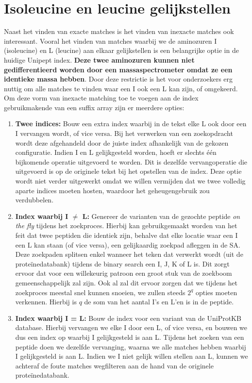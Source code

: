 \section{Isoleucine en leucine gelijkstellen}\label{sec:isoleucine-en-leucine-equivalentie}
Naast het vinden van exacte matches is het vinden van inexacte matches ook interessant.
Vooral het vinden van matches waarbij we de aminozuren I (isoleucine) en L (leucine) aan elkaar gelijkstellen is een belangrijke optie in de huidige Unipept index.
\textbf{Deze twee aminozuren kunnen niet gedifferentieerd worden door een massaspectrometer omdat ze een identieke massa hebben}.
Door deze restrictie is het voor onderzoekers erg nuttig om alle matches te vinden waar een I ook een L kan zijn, of omgekeerd.
Om deze vorm van inexacte matching toe te voegen aan de index gebruikmakende van een suffix array zijn er meerdere opties:
\begin{enumerate}
    \item \textbf{Twee indices:} Bouw een extra index waarbij in de tekst elke L ook door een I vervangen wordt, of vice versa.
    Bij het verwerken van een zoekopdracht wordt deze afgehandeld door de juiste index afhankelijk van de gekozen configuratie.
    Indien I en L gelijkgesteld worden, hoeft er slechts één bijkomende operatie uitgevoerd te worden.
    Dit is dezelfde vervangoperatie die uitgevoerd is op de originele tekst bij het opstellen van de index.
    Deze optie wordt niet verder uitgewerkt omdat we willen vermijden dat we twee volledig aparte indices moeten hosten, waardoor het geheugengebruik zou verdubbelen.
    \item \textbf{Index waarbij I $\neq$ L:} Genereer de varianten van de gezochte peptide \textit{on the fly} tijdens het zoekproces.
    Hierbij kan gebruikgemaakt worden van het feit dat twee peptiden die identiek zijn, behalve dat elke locatie waar een I een L kan staan (of vice versa), een gelijkaardig zoekpad afleggen in de SA\@.
    Deze zoekpaden splitsen enkel wanneer het teken dat verwerkt wordt (uit de proteïnedatabank) tijdens de binary search een I, J, K of L is.
    Dit zorgt ervoor dat voor een willekeurig patroon een groot stuk van de zoekboom gemeenschappelijk zal zijn.
    Ook al zal dit ervoor zorgen dat we tijdens het zoekproces meestal snel kunnen snoeien, we zullen steeds $2^{q}$ opties moeten verkennen.
    Hierbij is $q$ de som van het aantal I's en L'en is in de peptide.
    \item \textbf{Index waarbij I = L:} Bouw de index voor een variant van de UniProtKB database.
    Hierbij vervangen we elke I door een L, of vice versa, en bouwen we dus een index op waarbij I gelijkgesteld is aan L\@.
    Tijdens het zoeken van een peptide doen we dezelfde vervanging, waarna we alle matches hebben waarbij I gelijkgesteld is aan L\@.
    Indien we I niet gelijk willen stellen aan L, kunnen we achteraf de foute matches wegfilteren aan de hand van de originele proteïnedatabank.
\end{enumerate}

